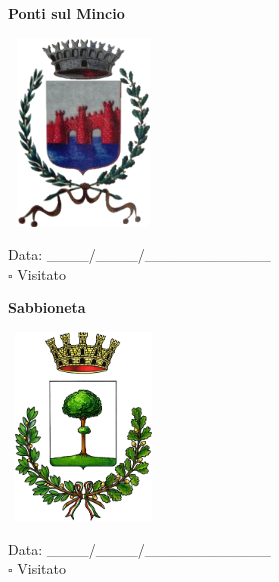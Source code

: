 \documentclass[a5paper,12pt]{article}
\begin{document}
\newpage

\noindent
\begin{minipage}[t]{0.45\textwidth}
    \begin{center}
        \textbf{Ponti sul Mincio}
    \end{center}
    \vspace{-0.5cm} %
    \begin{center}
        \includegraphics[height= 5cm, width=4cm]{Lombardia/Stemma Ponti sul Mincio.png}
    \end{center}
    \vspace{-0.4cm} %
    \begin{flushleft}
        Data: \_\_\_\_/\_\_\_\_/\_\_\_\_\_\_\_\_\_\_\_\_ \\
        $\square$ Visitato
    \end{flushleft}
\end{minipage}
\hfill
\noindent
\begin{minipage}[t]{0.45\textwidth}
    \begin{center}
        \textbf{Sabbioneta}
    \end{center}
    \vspace{-0.5cm} %
    \begin{center}
        \includegraphics[height= 5cm, width=4cm]{Lombardia/Stemma Sabbioneta.png}
    \end{center}
    \vspace{-0.4cm} %
    \begin{flushleft}
        Data: \_\_\_\_/\_\_\_\_/\_\_\_\_\_\_\_\_\_\_\_\_ \\
        $\square$ Visitato
    \end{flushleft}
\end{minipage}
\end{document}
